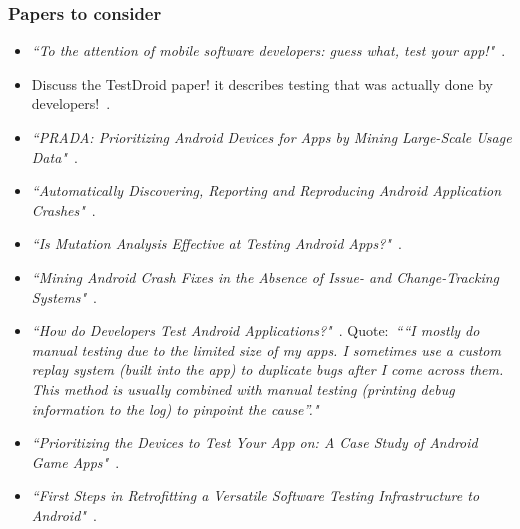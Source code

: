 \subsubsection{Papers to consider}
\begin{itemize}
    \item \emph{``To the attention of mobile software developers: guess what, test your app!"}~\citep{cruz2019_guess_what_test_your_app}.
    
    \item Discuss the TestDroid paper! it describes testing that was actually done by developers!~\citet{kaasila2012_testdroid_etc}.
    
    \item \emph{``PRADA: Prioritizing Android Devices for Apps by Mining Large-Scale Usage Data"}~\citep{lu2016_PRADA}. 
        
    \item \emph{``Automatically Discovering, Reporting and Reproducing Android Application Crashes"}~\citep{moran2016_automatically_drr_android_app_crashes}.
    
    \item \emph{``Is Mutation Analysis Effective at Testing Android Apps?"}~\citep{deng2017_is_mutation_analysis_effective_at_testing_android_apps}.
    
    \item \emph{``Mining Android Crash Fixes in the Absence of Issue- and Change-Tracking Systems"}~\citep{kong2019_mining_android_crash_fixes}.
    
    \item \emph{``How do Developers Test Android Applications?"}~\citep{linares2017_how_do_developers_test_android_apps}. Quote:~\emph{``“I mostly do manual testing due to the limited size of my apps. I sometimes use a custom replay system (built into the app) to duplicate bugs after I come across them. This method is usually combined with manual testing (printing debug information to the log) to pinpoint the cause”."}
    
    \item \emph{``Prioritizing the Devices to Test Your App on: A Case Study of Android Game Apps"}~\citep{khalid2014_prioritizing_the_devices_to_test_your_app_on_casestudy_android_games}.
    
    \item \emph{``First Steps in Retrofitting a Versatile Software Testing Infrastructure to Android"}~\citep{oliver2018_first_steps_in_retrofitting_a_versatile_sw_testing_architecture}.
    

\end{itemize}
